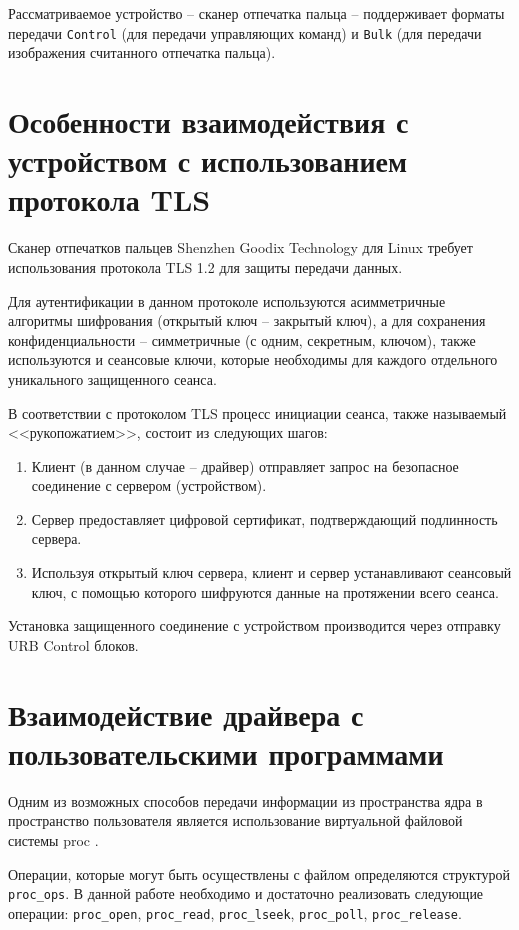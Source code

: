 Рассматриваемое устройство -- сканер отпечатка пальца -- поддерживает форматы передачи \texttt{Control} (для передачи управляющих команд) и \texttt{Bulk} (для передачи изображения считанного отпечатка пальца).

\section{Особенности взаимодействия с устройством с использованием протокола TLS}

Сканер отпечатков пальцев Shenzhen Goodix Technology для Linux требует использования протокола TLS 1.2 для защиты передачи данных.

Для аутентификации в данном протоколе используются асимметричные алгоритмы
шифрования (открытый ключ -- закрытый ключ), а для сохранения конфиденциальности --
симметричные (с одним, секретным, ключом), также используются и сеансовые ключи, которые
необходимы для каждого отдельного уникального защищенного сеанса.

В соответствии с протоколом TLS процесс инициации сеанса, также называемый <<рукопожатием>>, состоит из следующих шагов:

\begin{enumerate}
    \item Клиент (в данном случае -- драйвер) отправляет запрос на безопасное соединение с сервером (устройством).
    \item Сервер предоставляет цифровой сертификат, подтверждающий подлинность сервера.
    \item Используя открытый ключ сервера, клиент и сервер устанавливают сеансовый ключ, с помощью которого шифруются данные на протяжении всего сеанса.
\end{enumerate}

Установка защищенного соединение с устройством производится через отправку URB Control блоков.

\section{Взаимодействие драйвера с пользовательскими программами}

Одним из возможных способов передачи информации из пространства ядра в пространство пользователя является использование виртуальной файловой системы proc \cite{vfs-proc}.

Операции, которые могут быть осуществлены с файлом определяются структурой \texttt{proc\_ops}. В данной работе необходимо и достаточно реализовать следующие операции: \texttt{proc\_open}, \texttt{proc\_read}, \texttt{proc\_lseek}, \texttt{proc\_poll}, \texttt{proc\_release}.

